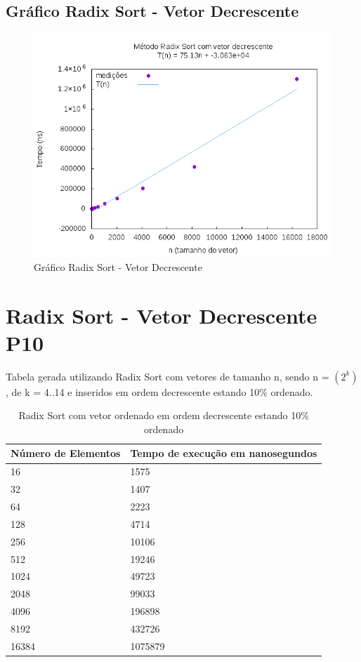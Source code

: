 \documentclass[12pt,a4paper,twoside]{report}
\begin{document}
\subsection{Gráfico Radix Sort - Vetor Decrescente}
\begin{figure}[H]
    \centering
    \includegraphics[width=0.7\linewidth]{graficos/RadixSort/vIntDecrescente/vIntDecrescente.png}
  \caption{Gráfico Radix Sort - Vetor Decrescente}
\end{figure}

\section{Radix Sort - Vetor Decrescente P10}
Tabela gerada utilizando Radix Sort com vetores de tamanho n, sendo n = $(2^k)$, de k = 4..14 e inseridos em ordem decrescente estando 10\% ordenado.
\begin{table}[H]
\centering
\caption{Radix Sort com vetor ordenado em ordem decrescente estando 10\% ordenado}
\label{my-label}
\begin{tabular}{|l|l|}
\hline
\multicolumn{1}{|c|}{\textbf{Número de Elementos}} & \multicolumn{1}{c|}{\textbf{Tempo de execução em nanosegundos}} \\ \hline
16 & 1575 \\ \hline
32 & 1407 \\ \hline
64 & 2223 \\ \hline
128 & 4714 \\ \hline
256 & 10106 \\ \hline
512 & 19246 \\ \hline
1024 & 49723 \\ \hline
2048 & 99033 \\ \hline
4096 & 196898 \\ \hline
8192 & 432726 \\ \hline
16384 & 1075879 \\ \hline
\end{tabular}
\end{table}
\end{document}

